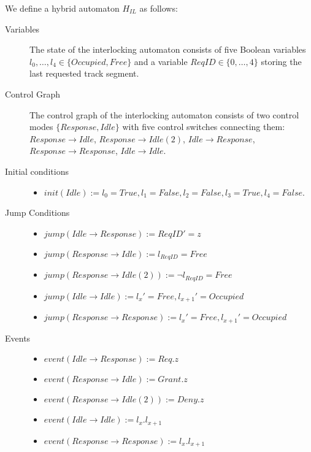\begin{mydef}
We define a hybrid automaton $H_{IL}$ as follows:
\begin{description}
\item[Variables] The state of the interlocking automaton consists of five Boolean variables  $l_0, \ldots , l_4  \in \{Occupied, Free\}$ and a variable $ReqID \in \{0 , \ldots , 4 \}$ storing the last requested track segment.

\item[Control Graph] The control graph of the interlocking automaton consists of two control modes $\{Response, Idle \}$ with five control switches connecting them: $Response \to Idle$, $Response \to Idle (2)$, $Idle \to Response$, $Response \to Response$, $Idle \to Idle$.

\item[Initial conditions] \hspace*{0mm}
	\begin{itemize}
	\item $init(Idle) := l_0 = True, l_1 = False, l_2 = False, l_3 = True, l_4 = False$.

	\end{itemize}

\item[Jump Conditions] \hspace*{0mm}

	\begin{itemize}
	\item $jump(Idle \to Response) :=  ReqID' = z$

	
	\item $jump(Response \to Idle) :=  l_{ReqID} = Free $ 
    

         \item $jump(Response \to Idle (2)) :=  \neg l_{ReqID} = Free$


	\item $jump(Idle \to Idle) :=  l_x' = Free, l_{x+1}' = Occupied$

	\item $jump(Response \to Response) := l_x' = Free, l_{x+1}' = Occupied$


	\end{itemize}

\item[Events] \hspace*{0mm}
\begin{itemize}
	\item $event(Idle \to Response) := Req.z$
	\item $event(Response \to Idle) := Grant.z$
	\item $event(Response \to Idle (2)) := Deny.z$
	\item $event(Idle \to Idle) := l_x.l_{x+1}$
	\item $event(Response \to Response) := l_x.l_{x+1}$	
\end{itemize}

\end{description}
\end{mydef} 
